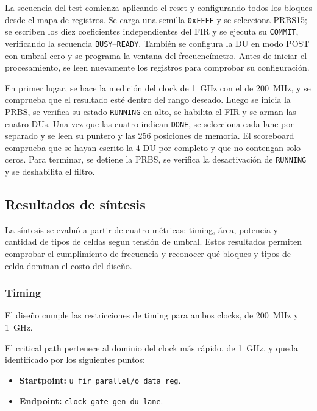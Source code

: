 \documentclass[10pt,a4paper]{article}
\begin{document}
La secuencia del test comienza aplicando el reset y configurando todos los bloques desde el
mapa de registros. Se carga una semilla \texttt{0xFFFF} y se selecciona PRBS15;
se escriben los diez coeficientes independientes del FIR y se ejecuta su
\texttt{COMMIT}, verificando la secuencia \texttt{BUSY}--\texttt{READY}. También
se configura la DU en modo POST con umbral cero y se programa la ventana del
frecuencímetro. Antes de iniciar el procesamiento, se leen nuevamente los
registros para comprobar su configuración.

En primer lugar, se hace la medición del clock de 1~GHz con el de 200~MHz, y se
comprueba que el resultado esté dentro del rango deseado. Luego se inicia la
PRBS, se verifica su estado \texttt{RUNNING} en alto, se habilita el FIR y se arman las
cuatro DUs. Una vez que las cuatro indican \texttt{DONE}, se selecciona cada lane
por separado y se leen su puntero y las 256 posiciones de memoria. El scoreboard
comprueba que se hayan escrito la 4 DU por completo y que no contengan solo ceros. 
Para terminar, se detiene la PRBS, se verifica la desactivación de \texttt{RUNNING} y 
se deshabilita el filtro.

\subsection{Resultados de síntesis}
\label{subsec:top-sintesis}

La síntesis se evaluó a partir de cuatro métricas: timing, área, potencia y
cantidad de tipos de celdas segun tensión de umbral. Estos resultados permiten
comprobar el cumplimiento de frecuencia y reconocer qué bloques y tipos de celda
dominan el costo del diseño.

\subsubsection*{Timing}
El diseño cumple las restricciones de timing para ambos clocks, de 200~MHz y
1~GHz.

El critical path pertenece al dominio del clock más rápido, de 1~GHz, y queda
identificado por los siguientes puntos:

\begin{itemize}
    \item \textbf{Startpoint:} \texttt{u\_fir\_parallel/o\_data\_reg}.
    \item \textbf{Endpoint:} \texttt{clock\_gate\_gen\_du\_lane}.
\end{itemize}
\end{document}
